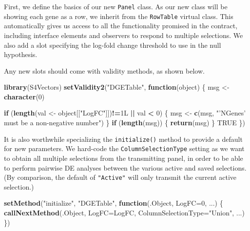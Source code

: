 \documentclass[]{book}
\newenvironment{Shaded}{\begin{snugshade}}{\end{snugshade}}
\newcommand{\KeywordTok}[1]{\textcolor[rgb]{0.13,0.29,0.53}{\textbf{#1}}}
\newcommand{\DataTypeTok}[1]{\textcolor[rgb]{0.13,0.29,0.53}{#1}}
\newcommand{\DecValTok}[1]{\textcolor[rgb]{0.00,0.00,0.81}{#1}}
\newcommand{\StringTok}[1]{\textcolor[rgb]{0.31,0.60,0.02}{#1}}
\newcommand{\OtherTok}[1]{\textcolor[rgb]{0.56,0.35,0.01}{#1}}
\newcommand{\ControlFlowTok}[1]{\textcolor[rgb]{0.13,0.29,0.53}{\textbf{#1}}}
\newcommand{\OperatorTok}[1]{\textcolor[rgb]{0.81,0.36,0.00}{\textbf{#1}}}
\newcommand{\NormalTok}[1]{#1}
\begin{document}
First, we define the basics of our new \texttt{Panel} class. As our new
class will be showing each gene as a row, we inherit from the
\texttt{RowTable} virtual class. This automatically gives us access to
all the functionality promised in the contract, including interface
elements and observers to respond to multiple selections. We also add a
slot specifying the log-fold change threshold to use in the null
hypothesis.

Any new slots should come with validity methods, as shown below.

\begin{Shaded}
\begin{Highlighting}[]
\KeywordTok{library}\NormalTok{(S4Vectors)}
\KeywordTok{setValidity2}\NormalTok{(}\StringTok{"DGETable"}\NormalTok{, }\ControlFlowTok{function}\NormalTok{(object) \{}
\NormalTok{    msg <-}\StringTok{ }\KeywordTok{character}\NormalTok{(}\DecValTok{0}\NormalTok{)}

    \ControlFlowTok{if}\NormalTok{ (}\KeywordTok{length}\NormalTok{(val <-}\StringTok{ }\NormalTok{object[[}\StringTok{"LogFC"}\NormalTok{]])}\OperatorTok{!=}\NormalTok{1L }\OperatorTok{||}\StringTok{ }\NormalTok{val }\OperatorTok{<}\StringTok{ }\DecValTok{0}\NormalTok{) \{}
\NormalTok{        msg <-}\StringTok{ }\KeywordTok{c}\NormalTok{(msg, }\StringTok{"'NGenes' must be a non-negative number"}\NormalTok{)}
\NormalTok{    \}}
    \ControlFlowTok{if}\NormalTok{ (}\KeywordTok{length}\NormalTok{(msg)) \{}
        \KeywordTok{return}\NormalTok{(msg)}
\NormalTok{    \}}
    \OtherTok{TRUE}
\NormalTok{\})}
\end{Highlighting}
\end{Shaded}

It is also worthwhile specializing the \texttt{initialize()} method to
provide a default for new parameters. We hard-code the
\texttt{ColumnSelectionType} setting as we want to obtain all multiple
selections from the transmitting panel, in order to be able to perform
pairwise DE analyses between the various active and saved selections.
(By comparison, the default of \texttt{"Active"} will only transmit the
current active selection.)

\begin{Shaded}
\begin{Highlighting}[]
\KeywordTok{setMethod}\NormalTok{(}\StringTok{"initialize"}\NormalTok{, }\StringTok{"DGETable"}\NormalTok{, }
    \ControlFlowTok{function}\NormalTok{(.Object, }\DataTypeTok{LogFC=}\DecValTok{0}\NormalTok{, ...) }
\NormalTok{\{}
    \KeywordTok{callNextMethod}\NormalTok{(.Object, }\DataTypeTok{LogFC=}\NormalTok{LogFC, }\DataTypeTok{ColumnSelectionType=}\StringTok{"Union"}\NormalTok{, ...)}
\NormalTok{\})}
\end{Highlighting}
\end{Shaded}
\end{document}
